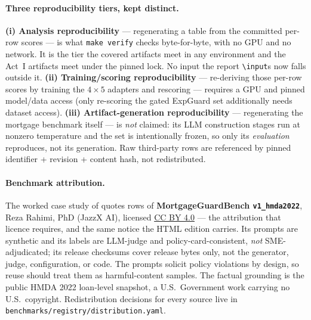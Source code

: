 \documentclass[11pt]{article}
\newcommand{\code}[1]{\texttt{\small #1}}
\begin{document}
\paragraph{Three reproducibility tiers, kept distinct.} \textbf{(i) Analysis reproducibility} --- regenerating
a table from the committed per-row scores --- is what \code{make verify} checks byte-for-byte, with no
GPU and no network. It is the tier the \ReproNVerified{} covered artifacts meet in any environment and the
\ReproNEnvGated{} Act~I artifacts meet under the pinned lock. No input the report
\code{\textbackslash input}s now falls outside it.
\textbf{(ii) Training/scoring reproducibility} --- re-deriving those per-row scores by training the $4\times5$
adapters and rescoring --- requires a GPU and pinned model/data access (only re-scoring the gated ExpGuard
set additionally needs dataset access). \textbf{(iii) Artifact-generation reproducibility} --- regenerating
the mortgage benchmark itself --- is \emph{not} claimed: its LLM construction stages run at nonzero
temperature and the set is intentionally frozen, so only its \emph{evaluation} reproduces, not its
generation. Raw third-party rows are referenced by pinned identifier + revision + content hash, not
redistributed.

\paragraph{Benchmark attribution.} \begin{sloppypar}The worked case study of 
quotes rows of \textbf{MortgageGuardBench \code{v1\_hmda2022}}, Reza Rahimi, PhD (JazzX AI), licensed
\href{https://creativecommons.org/licenses/by/4.0/}{CC BY 4.0} --- the attribution that licence
requires, and the same notice the HTML edition carries. Its prompts are synthetic and its labels are
LLM-judge and policy-card-consistent, \emph{not} SME-adjudicated; its release checksums cover release
bytes only, not the generator, judge, configuration, or code. The prompts solicit policy violations by
design, so reuse should treat them as harmful-content samples. The factual grounding is the public HMDA
2022 loan-level snapshot, a U.S.\ Government work carrying no U.S.\ copyright. Redistribution decisions
for every source live in \code{benchmarks/registry/distribution.yaml}.\end{sloppypar}
\end{document}
